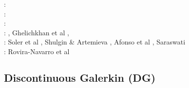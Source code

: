 \begin{scriptsize}
\twothousandfifteen: \cite{boem15}\cite{brrs15}\cite{furc15}\\
\twothousandsixteen: \cite{kord16}\cite{moek16}\cite{rond16}\cite{duti16}\cite{cogb16}\\
\twothousandseventeen: \cite{roev17}\\
\twothousandeighteen: \cite{pabn18}\cite{hamp18}, Ghelichkhan et al \cite{ghmc18}, \cite{homs18}\\
\twothousandnineteen: Soler et al \cite{sopg19}, Shulgin \& Artemieva \cite{shar19}, Afonso et al \cite{afss19}, 
Saraswati \cite{sacm19}\\
\twothousandtwenty: Rovira-Navarro et al \cite{rovb20}
\end{scriptsize}

\subsection{Discontinuous Galerkin (DG)}

